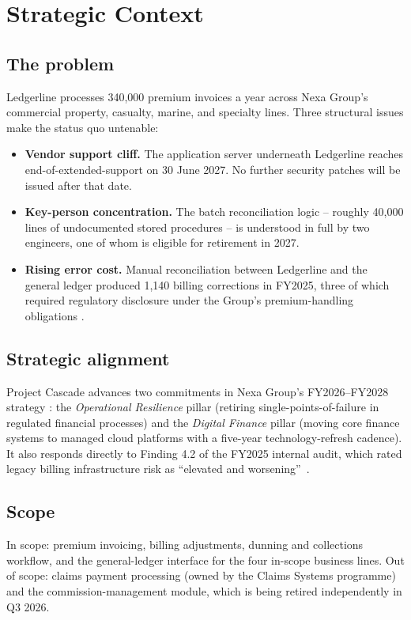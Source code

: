 \section{Strategic Context}

\subsection{The problem}
Ledgerline processes 340,000 premium invoices a year across Nexa Group's commercial property,
casualty, marine, and specialty lines. Three structural issues make the status quo untenable:

\begin{itemize}[leftmargin=1.4em]
  \item \textbf{Vendor support cliff.} The application server underneath Ledgerline reaches
        end-of-extended-support on 30 June 2027. No further security patches will be issued
        after that date.
  \item \textbf{Key-person concentration.} The batch reconciliation logic -- roughly 40,000
        lines of undocumented stored procedures -- is understood in full by two engineers, one
        of whom is eligible for retirement in 2027.
  \item \textbf{Rising error cost.} Manual reconciliation between Ledgerline and the general
        ledger produced 1,140 billing corrections in FY2025, three of which required
        regulatory disclosure under the Group's premium-handling obligations
        \cite{osei2025auditfindings}.
\end{itemize}

\subsection{Strategic alignment}
Project Cascade advances two commitments in Nexa Group's FY2026--FY2028 strategy
\cite{nexa2026strategy}: the
\emph{Operational Resilience} pillar (retiring single-points-of-failure in regulated financial
processes) and the \emph{Digital Finance} pillar (moving core finance systems to managed cloud
platforms with a five-year technology-refresh cadence). It also responds directly to Finding
4.2 of the FY2025 internal audit, which rated legacy billing infrastructure risk as
\textquotedblleft elevated and worsening\textquotedblright\ \cite{osei2025auditfindings}.

\subsection{Scope}
In scope: premium invoicing, billing adjustments, dunning and collections workflow, and the
general-ledger interface for the four in-scope business lines. Out of scope: claims payment
processing (owned by the Claims Systems programme) and the commission-management module, which
is being retired independently in Q3 2026.

